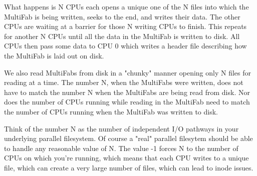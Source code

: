 What happens is N CPUs each opens a unique one of the N files into
which the MultiFab is being written, seeks to the end, and writes
their data.  The other CPUs are waiting at a barrier for those N
writing CPUs to finish.  This repeats for another N CPUs until all the
data in the MultiFab is written to disk.  All CPUs then pass some data
to CPU 0 which writes a header file describing how the MultiFab is
laid out on disk.

We also read MultiFabs from disk in a "chunky" manner opening only N
files for reading at a time.  The number N, when the MultiFabs were
written, does not have to match the number N when the MultiFabs are
being read from disk.  Nor does the number of CPUs running while
reading in the MultiFab need to match the number of CPUs running when
the MultiFab was written to disk.

Think of the number N as the number of independent I/O pathways in
your underlying parallel filesystem.  Of course a "real" parallel
filesytem should be able to handle any reasonable value of N.  The
value -1 forces N to the number of CPUs on which you're running, which
means that each CPU writes to a unique file, which can create a very
large number of files, which can lead to inode issues.


